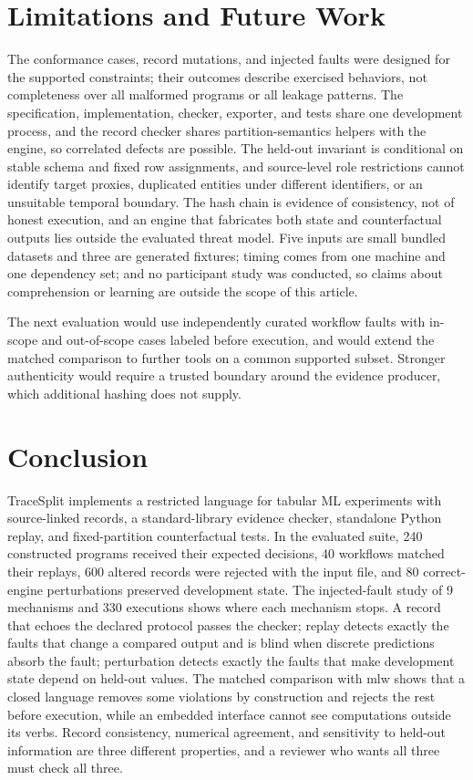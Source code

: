 \documentclass[lettersize,journal]{IEEEtran}
\newcommand{\tool}{TraceSplit}
\begin{document}
\section{Limitations and Future Work}
The conformance cases, record mutations, and injected faults were designed for the supported constraints; their outcomes describe exercised behaviors, not completeness over all malformed programs or all leakage patterns. The specification, implementation, checker, exporter, and tests share one development process, and the record checker shares partition-semantics helpers with the engine, so correlated defects are possible. The held-out invariant is conditional on stable schema and fixed row assignments, and source-level role restrictions cannot identify target proxies, duplicated entities under different identifiers, or an unsuitable temporal boundary. The hash chain is evidence of consistency, not of honest execution, and an engine that fabricates both state and counterfactual outputs lies outside the evaluated threat model. Five inputs are small bundled datasets and three are generated fixtures; timing comes from one machine and one dependency set; and no participant study was conducted, so claims about comprehension or learning are outside the scope of this article.

The next evaluation would use independently curated workflow faults with in-scope and out-of-scope cases labeled before execution, and would extend the matched comparison to further tools on a common supported subset. Stronger authenticity would require a trusted boundary around the evidence producer, which additional hashing does not supply.

\section{Conclusion}
\tool{} implements a restricted language for tabular ML experiments with source-linked records, a standard-library evidence checker, standalone Python replay, and fixed-partition counterfactual tests. In the evaluated suite, 240 constructed programs received their expected decisions, 40 workflows matched their replays, 600 altered records were rejected with the input file, and 80 correct-engine perturbations preserved development state. The injected-fault study of 9 mechanisms and 330 executions shows where each mechanism stops. A record that echoes the declared protocol passes the checker; replay detects exactly the faults that change a compared output and is blind when discrete predictions absorb the fault; perturbation detects exactly the faults that make development state depend on held-out values. The matched comparison with mlw shows that a closed language removes some violations by construction and rejects the rest before execution, while an embedded interface cannot see computations outside its verbs. Record consistency, numerical agreement, and sensitivity to held-out information are three different properties, and a reviewer who wants all three must check all three.



\end{document}
